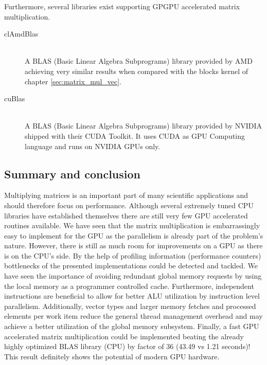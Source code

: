 Furthermore, several libraries exist supporting GPGPU accelerated matrix multiplication.

\begin{description}
   \item[clAmdBlas \cite{cl_amd_blas}] \hfill \\
   A BLAS (Basic Linear Algebra Subprograms) library provided by AMD achieving very similar results when compared with the blocks kernel of chapter \ref{sec:matrix_mul_vec}. 
   \item[cuBlas \cite{cublas}] \hfill \\
   A BLAS (Basic Linear Algebra Subprograms) library provided by NVIDIA shipped with their CUDA Toolkit. It uses CUDA as GPU Computing language and runs on NVIDIA GPUs only.
\end{description}

\subsection{Summary and conclusion}
Multiplying matrices is an important part of many scientific applications and should therefore focus on performance. Although several extremely tuned CPU libraries have established themselves there are still very few GPU accelerated routines available. We have seen that the matrix multiplication is embarrassingly easy to implement for the GPU as the parallelism is already part of the problem's nature. However, there is still as much room for improvements on a GPU as there is on the CPU's side. By the help of profiling information (performance counters) bottlenecks of the presented implementations could be detected and tackled. We have seen the importance of avoiding redundant global memory requests by using the local memory as a programmer controlled cache. Furthermore, independent instructions are beneficial to allow for better ALU utilization by instruction level parallelism. Additionally, vector types and larger memory fetches and processed elements per work item reduce the general thread management overhead and may achieve a better utilization of the global memory subsystem. Finally, a fast GPU accelerated matrix multiplication could be implemented beating the already highly optimized BLAS library (CPU) by factor of 36 (43.49 vs 1.21 seconds)! This result definitely shows the potential of modern GPU hardware.
